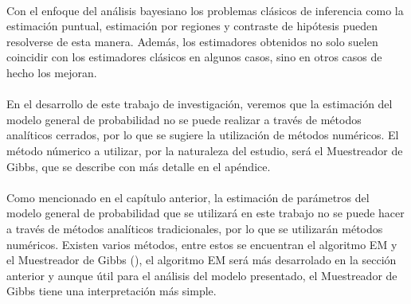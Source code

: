 \\
Con el enfoque del an\'alisis bayesiano los problemas cl\'asicos de inferencia como la estimaci\'on puntual, estimaci\'on por regiones y contraste de hip\'otesis pueden resolverse de esta manera. Adem\'as, los estimadores obtenidos no solo suelen coincidir con los estimadores cl\'asicos en algunos casos, sino en otros casos de hecho los mejoran.\\
\\
En el desarrollo de este trabajo de investigaci\'on, veremos que la estimaci\'on del modelo general de probabilidad no se puede realizar a trav\'es de m\'etodos anal\'iticos cerrados, por lo que se sugiere la utilizaci\'on de m\'etodos num\'ericos. El m\'etodo n\'umerico a utilizar, por la naturaleza del estudio, ser\'a el Muestreador de Gibbs, que se describe con m\'as detalle en el ap\'endice.\\
\\
Como mencionado en el cap\'itulo anterior, la estimaci\'on de par\'ametros del modelo general de probabilidad que se utilizar\'a en este trabajo no se puede hacer a trav\'es de m\'etodos anal\'iticos tradicionales, por lo que se utilizar\'an m\'etodos num\'ericos. Existen varios m\'etodos, entre estos se encuentran el algoritmo EM y el Muestreador de Gibbs (\cite{casella1992explaining}), el algoritmo EM ser\'a m\'as desarrolado en la secci\'on anterior y aunque \'util para el an\'alisis del modelo presentado, el Muestreador de Gibbs tiene una interpretaci\'on m\'as simple.\\
